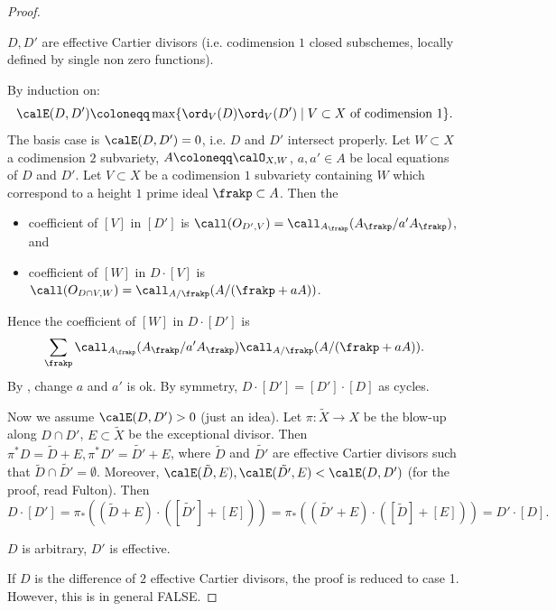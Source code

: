   \begin{proof}
    \hspace{1em}
    \begin{case}
      $D,D'$ are effective Cartier divisors (i.e. codimension $1$ closed subschemes, locally defined by single non zero functions).
    \end{case}
    By induction on:
    \[ \calE(D,D') \coloneqq \max \{ \ord_V (D) \ord_V (D') \mid V \subset X \text{ of codimension } 1 \}. \]
    The basis case is $\calE(D,D') = 0$, i.e. $D$ and $D'$ intersect properly.
    Let $W \subset X$ a codimension $2$ subvariety, $A \coloneqq \calO_{X,W}$, $a, a' \in A$ be local equations of $D$ and $D'$.
    Let $V \subset X$ be a codimension $1$ subvariety containing $W$ which correspond to a height $1$ prime ideal $\frakp \subset A$.
    Then the 
    \begin{itemize}
      \item coefficient of $[V]$ in $[D']$ is $\call(O_{D',V}) = \call_{A_\frakp} (A_\frakp / a' A_\frakp)$, and
      \item coefficient of $[W]$ in $D \cdot [V]$ is $\call(O_{D \cap V,W}) = \call_{A/\frakp} (A/(\frakp + a A))$.
    \end{itemize}
    Hence the coefficient of $[W]$ in $D \cdot [D']$ is 
    \[ \sum_\frakp \call_{A_\frakp}(A_\frakp / a' A_\frakp) \call_{A/\frakp}(A/(\frakp + a A)). \]
    By \cite[A 2.7 and A 2.8]{Fulton13Intersection}, change $a$ and $a'$ is ok.
    By symmetry, $D \cdot [D'] = [D'] \cdot [D]$ as cycles.

    Now we assume $\calE(D,D') > 0$ (just an idea).
    Let $\pi: \tilde{X} \to X$ be the blow-up along $D \cap D'$, $E \subset \tilde{X}$ be the exceptional divisor.
    Then $\pi^* D = \tilde{D} + E, \pi^* D' = \tilde{D'} + E$, where $\tilde{D}$ and $\tilde{D'}$ are effective Cartier divisors such that $\tilde{D} \cap \tilde{D'} = \emptyset$.
    Moreover, $\calE(\tilde{D}, E), \calE(\tilde{D'}, E) < \calE(D, D')$ (for the proof, read Fulton).
    Then 
    \[ D \cdot [D'] = \pi_*((\tilde{D} + E) \cdot ([\tilde{D'}] + [E])) = \pi_*((\tilde{D'} + E) \cdot ([\tilde{D}] + [E])) = D' \cdot [D]. \]

    \begin{case}
    $D$ is arbitrary, $D'$ is effective.
    \end{case}

    If $D$ is the difference of $2$ effective Cartier divisors, the proof is reduced to case 1.
    However, this is in general FALSE.


\end{proof}
